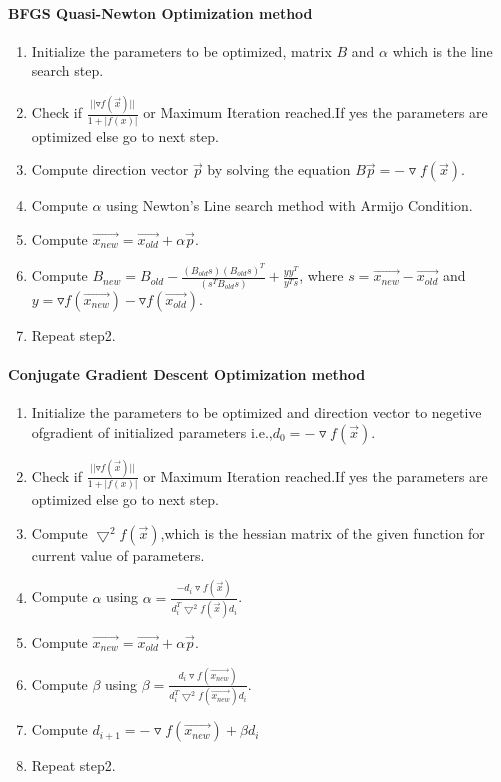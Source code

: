 \documentclass[paper=a4, fontsize=11pt]{scrartcl}
\numberwithin{equation}{section}		%
\numberwithin{figure}{section}			%
\numberwithin{table}{section}				%
\begin{document}
\paragraph{BFGS Quasi-Newton Optimization method}
\begin{enumerate}
  \item Initialize the parameters to be optimized, matrix $B$ and $\alpha$ which is the line search step.
  \item Check if $\frac{||{\triangledown f(\vec{x})}||}{1+|f(x)|}$ or Maximum Iteration reached.If yes the parameters are optimized else go to next step.
  \item Compute direction vector $\vec{p}$ by solving the equation $B\vec{p}=-\triangledown f(\vec{x})$.
  \item Compute $\alpha$ using Newton's Line search method with Armijo Condition.
  \item Compute $\vec{x_{new}}=\vec{x_{old}}+\alpha\vec{p}$.
  \item Compute $B_{new}=B_{old}-\frac{(B_{old}s)(B_{old}s)^T}{(s^TB_{old}s)}+\frac{yy^T}{y^Ts}$, where $s=\vec{x_{new}}-\vec{x_{old}}$ and $y=\triangledown f(\vec{x_{new}})-\triangledown f(\vec{x_{old}})$.
  \item Repeat step2.
\end{enumerate}

\paragraph{Conjugate Gradient Descent Optimization method}
\begin{enumerate}
  \item Initialize the parameters to be optimized and direction vector to negetive ofgradient of initialized parameters i.e.,$d_0=-\triangledown f(\vec{x})$.
  \item Check if $\frac{||{\triangledown f(\vec{x})}||}{1+|f(x)|}$ or Maximum Iteration reached.If yes the parameters are optimized else go to next step.
  \item Compute $\bigtriangledown^2 f(\vec{x})$,which is the hessian matrix of the given function for current value of parameters.
  \item Compute $\alpha$ using $\alpha=\frac{-d_i \triangledown f(\vec{x})}{d_i^T\bigtriangledown^2 f(\vec{x})d_i}$.
  \item Compute $\vec{x_{new}}=\vec{x_{old}}+\alpha\vec{p}$.
  \item Compute $\beta$ using $\beta=\frac{d_i \triangledown f(\vec{x_{new}})}{d_i^T\bigtriangledown^2 f(\vec{x_{new}})d_i}$.
  \item Compute $d_{i+1}=-\triangledown f(\vec{x_{new}})+ \beta d_i$
  \item Repeat step2.
\end{enumerate}
\end{document}
